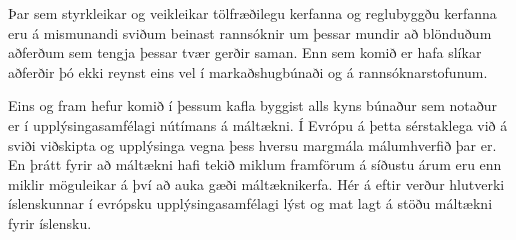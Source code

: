 \documentclass{../../metanetpaper}
\begin{document}
\begin{multicols}{2}
Þar sem styrkleikar og veikleikar tölfræðilegu kerfanna og reglubyggðu kerfanna eru á mismunandi sviðum beinast rannsóknir um þessar mundir að blönduðum aðferðum sem tengja þessar tvær gerðir saman. Enn sem komið er hafa slíkar aðferðir þó ekki reynst eins vel í markaðshugbúnaði og á rannsóknarstofunum.

Eins og fram hefur komið í þessum kafla byggist alls kyns búnaður sem notaður er í upplýsingasamfélagi nútímans á máltækni. Í Evrópu á þetta sérstaklega við á sviði viðskipta og upplýsinga vegna þess hversu margmála málumhverfið þar er. En þrátt fyrir að máltækni hafi tekið miklum framförum á síðustu árum eru enn miklir möguleikar á því að auka gæði máltæknikerfa. Hér á eftir verður hlutverki íslenskunnar í evrópsku upplýsingasamfélagi lýst og mat lagt á stöðu máltækni fyrir íslensku.
\end{multicols}

\clearpage


\end{document}
